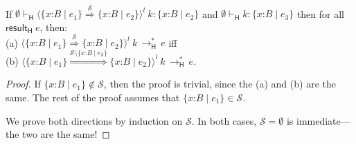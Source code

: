 \documentclass[9pt]{extarticle}
\newcommand{\ottnt}[1]{\mathit{#1}}
\newcommand{\ottsym}[1]{#1}
\begin{document}
{\begin{lemma}
  \label{lem:heedfulcastidempotence}
  ~

  \noindent
  If $ \emptyset   \vdash _{  \mathsf{H}  }   \langle   \{ \mathit{x} \mathord{:} \ottnt{B} \mathrel{\mid} \ottnt{e_{{\mathrm{1}}}} \}   \mathord{ \overset{ \mathcal{S} }{\Rightarrow} }   \{ \mathit{x} \mathord{:} \ottnt{B} \mathrel{\mid} \ottnt{e_{{\mathrm{2}}}} \}   \rangle^{ \ottnt{l} } ~  \ottnt{k}   :   \{ \mathit{x} \mathord{:} \ottnt{B} \mathrel{\mid} \ottnt{e_{{\mathrm{2}}}} \}  $ and
  $ \emptyset   \vdash _{  \mathsf{H}  }  \ottnt{k}  :   \{ \mathit{x} \mathord{:} \ottnt{B} \mathrel{\mid} \ottnt{e_{{\mathrm{3}}}} \}  $ then for all $ \mathsf{result} _{  \mathsf{H}  }~ \ottnt{e} $, then: \\
  (a) $ \langle   \{ \mathit{x} \mathord{:} \ottnt{B} \mathrel{\mid} \ottnt{e_{{\mathrm{1}}}} \}   \mathord{ \overset{ \mathcal{S} }{\Rightarrow} }   \{ \mathit{x} \mathord{:} \ottnt{B} \mathrel{\mid} \ottnt{e_{{\mathrm{2}}}} \}   \rangle^{ \ottnt{l} } ~  \ottnt{k}  \,  \longrightarrow ^{*}_{  \mathsf{H}  }  \, \ottnt{e}$ iff \\
  (b) $ \langle   \{ \mathit{x} \mathord{:} \ottnt{B} \mathrel{\mid} \ottnt{e_{{\mathrm{1}}}} \}   \mathord{ \overset{  \mathcal{S}  \setminus   \{ \mathit{x} \mathord{:} \ottnt{B} \mathrel{\mid} \ottnt{e_{{\mathrm{3}}}} \}   }{\Rightarrow} }   \{ \mathit{x} \mathord{:} \ottnt{B} \mathrel{\mid} \ottnt{e_{{\mathrm{2}}}} \}   \rangle^{ \ottnt{l} } ~  \ottnt{k}  \,  \longrightarrow ^{*}_{  \mathsf{H}  }  \, \ottnt{e}$.
\begin{proof}
    {\iffull
    If $  \{ \mathit{x} \mathord{:} \ottnt{B} \mathrel{\mid} \ottnt{e_{{\mathrm{1}}}} \}   \not\in  \mathcal{S} $, then the proof is trivial, since the
    (a) and (b) are the same. The rest of the proof assumes that
    $  \{ \mathit{x} \mathord{:} \ottnt{B} \mathrel{\mid} \ottnt{e_{{\mathrm{1}}}} \}   \in  \mathcal{S} $.

    We prove both directions by induction on $\mathcal{S}$.
In both cases, $\mathcal{S}  \ottsym{=}  \emptyset$ is immediate---the two are the same!

}
\end{proof}
\end{lemma}}
\end{document}
